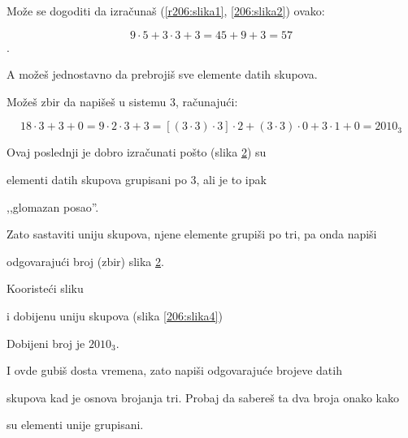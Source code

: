 \begin{zad}
\begin{figure}[H]
            \label{206:slika3}

        \end{figure}



        Mo\v ze se dogoditi da izra\v cuna\v s (\ref{r206:slika1}, \ref{206:slika2}) ovako:

        $$9 \cdot 5 + 3 \cdot 3 + 3 = 45 + 9 + 3 = 57$$.

        A mo\v ze\v s jednostavno da prebroji\v s sve elemente datih skupova.



        Mo\v ze\v s zbir da napi\v se\v s u sistemu 3, ra\v cunaju\' ci:

        $$18 \cdot 3 + 3 + 0 = 9 \cdot 2 \cdot 3 + 3 = [(3 \cdot 3) \cdot 3] \cdot 2 + (3 \cdot 3) \cdot 0 + 3 \cdot 1 + 0 = 2010_3$$



        Ovaj poslednji je dobro izra\v cunati po\v sto (slika \ref{206:slika3}) su

        elementi datih skupova grupisani po $3$, ali je to ipak

        ,,glomazan posao''.



        Zato sastaviti uniju skupova, njene elemente grupi\v si po tri, pa onda napi\v si

        odgovaraju\' ci broj (zbir) slika \ref{206:slika3}.



        Kooriste\' ci sliku %

        i dobijenu uniju skupova (slika \ref{206:slika4})

        \begin{figure}[H]

            \centering


            \caption{}

            \label{206:slika3}

        \end{figure}

        Dobijeni broj je $2010_3$.



        I ovde gubi\v s dosta vremena, zato napi\v si odgovaraju\' ce brojeve datih

        skupova kad je osnova brojanja tri. Probaj da sabere\v s ta dva broja onako kako

        su elementi unije grupisani.




\end{zad}

